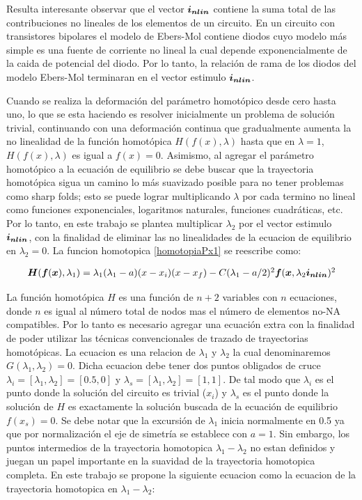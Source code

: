 \documentclass[conference,letterpaper,onecolumn]{IEEEtran}
\newcommand{\pig}[1]{\mbox{\boldmath ${#1}$}	}
\begin{document}
Resulta interesante observar que el vector $\pig{i_{nlin}}$ contiene la suma total de las contribuciones no lineales
de los elementos de un circuito. En un circuito con transistores bipolares el modelo de Ebers-Mol contiene
diodos cuyo modelo m\'as simple es una fuente de corriente no lineal la cual depende exponencialmente de la caida de potencial del diodo. Por lo tanto, la relación de rama de los diodos del modelo Ebers-Mol terminaran en el vector estimulo $\pig{i_{nlin}}$.

Cuando se realiza la deformación del parámetro homot\'opico desde cero hasta uno, lo que se esta haciendo es resolver
inicialmente un problema de solución trivial, continuando con una deformación continua que gradualmente
aumenta la no linealidad de la función homot\'opica $H(f(x),\lambda)$ hasta que en $\lambda=1$, $H(f(x),\lambda)$ es igual a $f(x)=0$.
Asimismo, al agregar el par\'ametro homot\'opico  a la ecuación de equilibrio se debe buscar que la trayectoria homot\'opica sigua un camino lo m\'as suavizado posible para no tener problemas como sharp folds; esto se puede lograr multiplicando $\lambda$ por cada termino no lineal como funciones exponenciales, logaritmos naturales, funciones cuadráticas, etc.
Por lo tanto, en este trabajo se plantea multiplicar $\lambda_2$ por el vector estimulo $\pig{i_{nlin}}$, con la finalidad
de eliminar las no linealidades de la ecuacion de equilibrio en $\lambda_2=0$. La funcion homotopica \ref{homotopiaPx1} se reescribe como:

\begin{equation}
{\small
\begin{array}{l}
\pig{H}(\pig{f}(\pig{x}),\lambda_1 )=\lambda_1(\lambda_1-a)(x-x_i)(x-x_f) -C(\lambda_1-a/2)^2 \pig{f}(\pig{x},\lambda_2\pig{i_{nlin}})^2
\end{array}}
\label{homotopiaPx3}
\end{equation}

La función homot\'opica $H$ es una función de $n+2$ variables con $n$ ecuaciones, donde $n$ es igual al n\'umero total de nodos
mas el n\'umero de elementos no-NA compatibles. Por lo tanto es necesario agregar una ecuación extra con la finalidad
de poder utilizar las técnicas convencionales de trazado de trayectorias homot\'opicas. 
La ecuacion es una relacion de $\lambda_1$ y $\lambda_2$ la cual denominaremos $G(\lambda_1,\lambda_2)=0$.
Dicha ecuacion debe tener dos puntos obligados de cruce $\lambda_i=[\lambda_1,\lambda_2]=[0.5,0]$ y $\lambda_s=[\lambda_1,\lambda_2]=[1,1]$. De tal modo que $\lambda_i$ es el punto donde la solución del circuito es trivial ($x_i$) y  $\lambda_s$
es el punto donde la solución de $H$ es exactamente la solución buscada de la ecuación de equilibrio $f(x_s)=0$.
Se debe notar que la excursión de $\lambda_1$ inicia normalmente en 0.5 ya que por normalizaci\'on el eje de simetría
se establece con $a=1$. Sin embargo, los puntos intermedios de la trayectoria homotopica $\lambda_1-\lambda_2$ no estan definidos y juegan un papel
importante en la suavidad de la trayectoria homotopica completa. En este trabajo se propone la siguiente ecuacion como la ecuacion de la trayectoria homotopica
en $\lambda_1-\lambda_2$:
\end{document}
